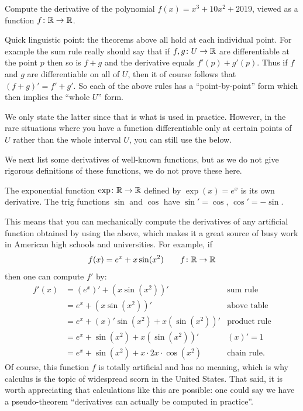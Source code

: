 \begin{exercise}
	Compute the derivative of the polynomial $f(x) = x^3 + 10x^2 + 2019$,
	viewed as a function $f \colon \mathbb R \to \mathbb R$.
\end{exercise}

\begin{remark}
	Quick linguistic point:
	the theorems above all hold at each individual point.
	For example the sum rule really should say that
	if $f,g \colon U \to \mathbb R$ are differentiable at the point $p$
	then so is $f+g$ and the derivative equals $f'(p) + g'(p)$.
	Thus if $f$ and $g$ are differentiable on all of $U$,
	then it of course follows that $(f+g)' = f' + g'$.
	So each of the above rules has a ``point-by-point'' form
	which then implies the ``whole $U$'' form.

	We only state the latter since that is what is used in practice.
	However, in the rare situations where you have a function
	differentiable only at certain points of $U$ rather
	than the whole interval $U$, you can still use the below.
\end{remark}

We next list some derivatives of well-known functions,
but as we do not give rigorous definitions
of these functions, we do not prove these here.
\begin{proposition}
	\listhack
	\begin{itemize}
		\ii The exponential function $\exp \colon \mathbb R \to \mathbb R$
		defined by $\exp(x) = e^x$ is its own derivative.
		\ii The trig functions $\sin$ and $\cos$
		have $\sin' = \cos$, $\cos' = -\sin$.
	\end{itemize}
\end{proposition}

\begin{example}
	This means that you can mechanically compute
	the derivatives of any artificial function obtained by using the above,
	which makes it a great source of busy work
	in American high schools and universities.
	For example, if
	\[ f(x) = e^x + x \sin(x^2) \qquad f \colon \mathbb R \to \mathbb R \]
	then one can compute $f'$ by:
	\begin{align*}
		f'(x) &= (e^x)' + (x \sin(x^2))' & \text{sum rule} \\
		&= e^x + (x \sin(x^2))' & \text{above table} \\
		&= e^x + (x)' \sin(x^2) + x (\sin(x^2))' & \text{product rule} \\
		&= e^x + \sin(x^2) + x (\sin(x^2))' & (x)' = 1 \\
		&= e^x + \sin(x^2) + x \cdot 2x \cdot \cos(x^2) & \text{chain rule}.
	\end{align*}
	Of course, this function $f$ is totally artificial and has no meaning,
	which is why calculus is the topic of widespread scorn in the United States.
	That said, it is worth appreciating that calculations like this are possible:
	one could say we have a pseudo-theorem
	``derivatives can actually be computed in practice''.
\end{example}

